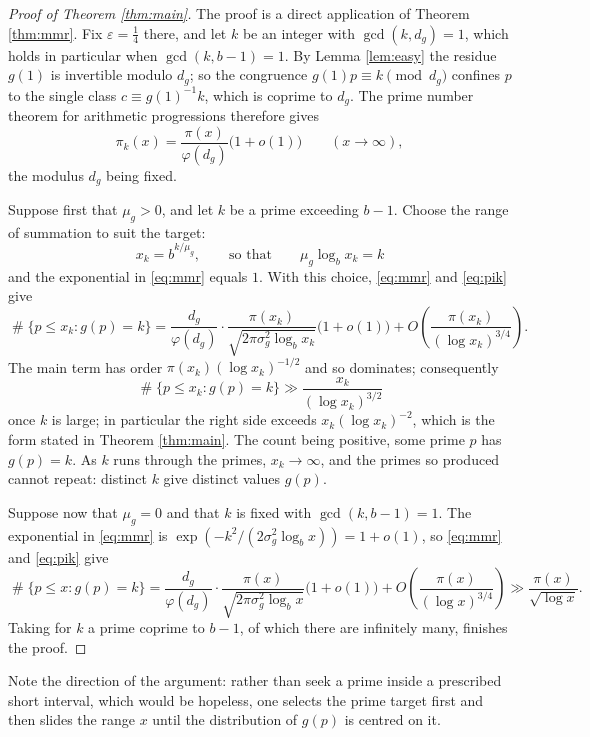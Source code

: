 \documentclass[11pt,reqno]{amsart}
\theoremstyle{plain}
\theoremstyle{definition}
\DeclareMathOperator{\Card}{\#}
\begin{document}
\begin{proof}[Proof of Theorem \ref{thm:main}]
The proof is a direct application of Theorem \ref{thm:mmr}. Fix $\varepsilon=\frac14$ there, and let $k$ be an integer with $\gcd(k,d_g)=1$, which holds in particular when $\gcd(k,b-1)=1$. By Lemma \ref{lem:easy} the residue $g(1)$ is invertible modulo $d_g$; so the congruence $g(1)p\equiv k \pmod{d_g}$ confines $p$ to the single class $c\equiv g(1)^{-1}k$, which is coprime to $d_g$. The prime number theorem for arithmetic progressions therefore gives
\begin{equation}\label{eq:pik}
\pi_k(x)=\frac{\pi(x)}{\varphi(d_g)}\big(1+o(1)\big)\qquad (x\to\infty),
\end{equation}
the modulus $d_g$ being fixed.

Suppose first that $\mu_g>0$, and let $k$ be a prime exceeding $b-1$. Choose the range of summation to suit the target:
\[
x_k=b^{k/\mu_g},\qquad\text{so that}\qquad \mu_g\log_b x_k=k
\]
and the exponential in \eqref{eq:mmr} equals $1$. With this choice, \eqref{eq:mmr} and \eqref{eq:pik} give
\[
\Card\{p\le x_k: g(p)=k\}=\frac{d_g}{\varphi(d_g)}\cdot\frac{\pi(x_k)}{\sqrt{2\pi\sigma_g^2\log_b x_k}}\big(1+o(1)\big)+O\!\left(\frac{\pi(x_k)}{(\log x_k)^{3/4}}\right).
\]
The main term has order $\pi(x_k)(\log x_k)^{-1/2}$ and so dominates; consequently
\begin{equation}\label{eq:lower}
\Card\{p\le x_k: g(p)=k\}\gg \frac{x_k}{(\log x_k)^{3/2}}
\end{equation}
once $k$ is large; in particular the right side exceeds $x_k(\log x_k)^{-2}$, which is the form stated in Theorem \ref{thm:main}. The count being positive, some prime $p$ has $g(p)=k$. As $k$ runs through the primes, $x_k\to\infty$, and the primes so produced cannot repeat: distinct $k$ give distinct values $g(p)$.

Suppose now that $\mu_g=0$ and that $k$ is fixed with $\gcd(k,b-1)=1$. The exponential in \eqref{eq:mmr} is $\exp(-k^2/(2\sigma_g^2\log_b x))=1+o(1)$, so \eqref{eq:mmr} and \eqref{eq:pik} give
\[
\Card\{p\le x: g(p)=k\}=\frac{d_g}{\varphi(d_g)}\cdot\frac{\pi(x)}{\sqrt{2\pi\sigma_g^2\log_b x}}\big(1+o(1)\big)+O\!\left(\frac{\pi(x)}{(\log x)^{3/4}}\right)\gg\frac{\pi(x)}{\sqrt{\log x}} .
\]
Taking for $k$ a prime coprime to $b-1$, of which there are infinitely many, finishes the proof.
\end{proof}

Note the direction of the argument: rather than seek a prime inside a prescribed short interval, which would be hopeless, one selects the prime target first and then slides the range $x$ until the distribution of $g(p)$ is centred on it.
\end{document}
